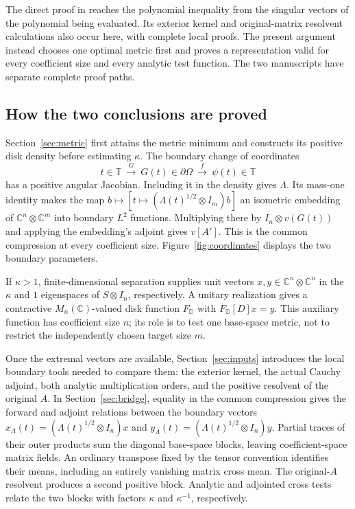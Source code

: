 \documentclass[11pt]{article}
\newcommand{\C}{\mathbb C}
\newcommand{\D}{\mathbb D}
\newcommand{\T}{\mathbb T}
\theoremstyle{definition}
\theoremstyle{remark}
\numberwithin{equation}{section}
\begin{document}
The direct proof in \cite{Direct} reaches the polynomial inequality
from the singular vectors of the polynomial being evaluated. Its exterior
kernel and original-matrix resolvent calculations also occur here, with
complete local proofs. The present argument instead chooses one optimal
metric first and proves a representation valid for every coefficient size
and every analytic test function. The two manuscripts have separate
complete proof paths.

\subsection*{How the two conclusions are proved}
Section~\ref{sec:metric} first attains the metric minimum and constructs
its positive disk density before estimating $\kappa$. The boundary change
of coordinates
\[
 t\in\T\ \xrightarrow{\ G\ }\ G(t)\in\partial\Omega
 \ \xrightarrow{\ f\ }\ \psi(t)\in\T
\]
has a positive angular Jacobian. Including it in the density gives
$\Lambda$. Its mass-one identity makes the map
$b\mapsto[t\mapsto(\Lambda(t)^{1/2}\otimes I_m)b]$ an isometric
embedding of $\C^n\otimes\C^m$ into boundary $L^2$ functions.
Multiplying there by $I_n\otimes v(G(t))$ and applying the embedding's
adjoint gives $v[A']$. This is the common compression at every coefficient size.
Figure~\ref{fig:coordinates} displays the two boundary parameters.




If $\kappa>1$, finite-dimensional separation supplies unit vectors
$x,y\in\C^n\otimes\C^n$ in the $\kappa$ and $1$ eigenspaces of
$S\otimes I_n$, respectively. A unitary realization gives a contractive
$M_n(\C)$-valued disk function $F_\D$ with $F_\D[D]x=y$.
This auxiliary function has coefficient
size $n$; its role is to test one base-space metric, not to restrict the
independently chosen target size $m$.

Once the extremal vectors are available, Section~\ref{sec:inputs}
introduces the local boundary tools needed to compare them: the exterior
kernel, the actual Cauchy adjoint, both analytic multiplication orders,
and the positive resolvent of the original $A$. In
Section~\ref{sec:bridge}, equality in the common compression gives the
forward and adjoint relations between the
boundary vectors $x_\Lambda(t)=(\Lambda(t)^{1/2}\otimes I_n)x$ and
$y_\Lambda(t)=(\Lambda(t)^{1/2}\otimes I_n)y$.
Partial traces of their outer products sum the diagonal base-space blocks,
leaving coefficient-space matrix fields. An ordinary transpose fixed by
the tensor convention identifies their means, including an entirely
vanishing matrix cross mean. The original-$A$ resolvent produces
a second positive block. Analytic and adjointed cross tests relate the
two blocks with factors $\kappa$ and $\kappa^{-1}$, respectively.
\end{document}
